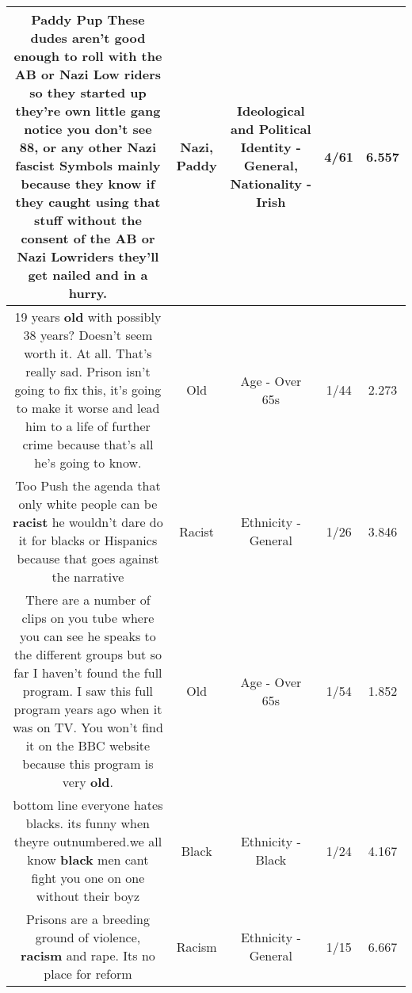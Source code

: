 \documentclass[11pt]{article}
\newlength\mylength
\begin{document}
\begin{center}
\begin{longtable}{|C{.65\mylength}|C{.30\mylength}|C{.12\mylength}|C{.12\mylength}|C{.12\mylength}|}
  \small Paddy Pup These dudes aren't good enough to roll with the AB or \textbf{Nazi} Low riders so they started up they're own little gang notice you don't see 88, or  any other \textbf{Nazi} fascist Symbols mainly because they know if they caught using that stuff without the consent of the AB or \textbf{Nazi} Lowriders they'll get nailed and in a hurry.\normalsize   & Nazi, Paddy &  Ideological and Political Identity - General, Nationality - Irish & 4/61 & 6.557 \\  \hline
  \small 19 years \textbf{old} with possibly 38 years? Doesn't seem worth it. At all. That's really sad. Prison isn't going to fix this, it's going to make it worse and lead him to a life of further crime because that's all he's going to know.\normalsize   & Old & Age - Over 65s & 1/44 & 2.273 \\  \hline
  \small Too Push the agenda that only white people can be \textbf{racist} he wouldn't dare do it for blacks or Hispanics because that goes against the narrative\normalsize   & Racist & Ethnicity - General & 1/26 & 3.846 \\  \hline
  \small There are a number of clips on you tube where you can see he speaks to the different groups but so far I haven't found the full program. I saw this full program years ago when it was on TV. You won't find it on the BBC website because this program is very \textbf{old}.\normalsize   & Old & Age - Over 65s & 1/54 & 1.852 \\  \hline
  \small bottom line everyone hates blacks. its funny when theyre outnumbered.we all know \textbf{black} men cant fight you one on one without their boyz\normalsize   & Black & Ethnicity - Black & 1/24 & 4.167 \\  \hline
  \small Prisons are a breeding ground of violence, \textbf{racism} and rape. Its no place for reform\normalsize   & Racism & Ethnicity - General & 1/15 & 6.667 \\  \hline

\end{longtable}
\end{center}
\end{document}
